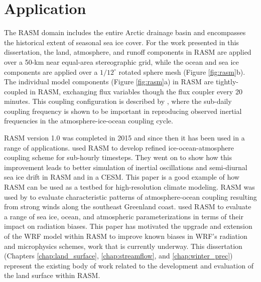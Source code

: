 \section{Application}

The RASM domain includes the entire Arctic drainage basin and encompasses the historical extent of seasonal sea ice cover.
For the work presented in this dissertation, the land, atmosphere, and runoff components in RASM are applied over a 50-km near equal-area stereographic grid, while the ocean and sea ice components are applied over a $1/12^{\circ}$ rotated sphere mesh (Figure \ref{fig:rasm}b).
The individual model components (Figure \ref{fig:rasm}a) in RASM are tightly-coupled in RASM, exchanging flux variables though the flux coupler every 20 minutes.
This coupling configuration is described by \citet{Roberts_2015a}, where the sub-daily coupling frequency is shown to be important in reproducing observed inertial frequencies in the atmosphere-ice-ocean coupling cycle.

RASM version 1.0 was completed in 2015 and since then it has been used in a range of applications.
\citet{Roberts_2015a} used RASM to develop refined ice-ocean-atmosphere coupling scheme for sub-hourly timesteps.
They went on to show how this improvement leads to better simulation of inertial oscillations and semi-diurnal sea ice drift in RASM and in a CESM.
This paper is a good example of how RASM can be used as a testbed for high-resolution climate modeling.
RASM was used by \citet{DuVivier_2016} to evaluate characteristic patterns of atmosphere-ocean coupling resulting from strong winds along the southeast Greenland coast.
\citet{Cassano_2016} used RASM to evaluate a range of sea ice, ocean, and atmospheric parameterizations in terms of their impact on radiation biases.
This paper has motivated the upgrade and extension of the WRF model within RASM to improve known biases in WRF's radiation and microphysics schemes, work that is currently underway.
This dissertation (Chapters \ref{chap:land_surface}, \ref{chap:streamflow}, and \ref{chap:winter_prec}) represent the existing body of work related to the development and evaluation of the land surface within RASM.
